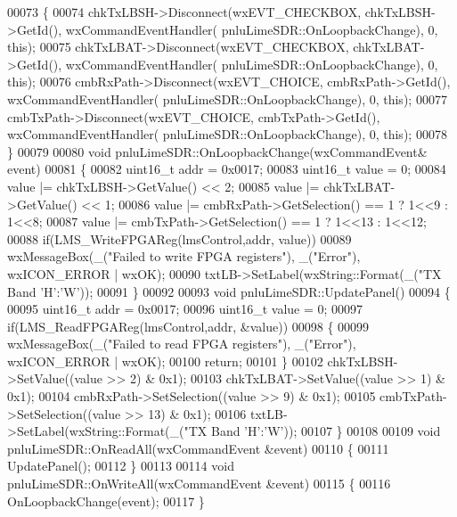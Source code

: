 \begin{DoxyCode}
00073 \{
00074     chkTxLBSH->Disconnect(wxEVT\_CHECKBOX, chkTxLBSH->GetId(), wxCommandEventHandler(
      pnluLimeSDR::OnLoopbackChange), 0, \textcolor{keyword}{this});
00075     chkTxLBAT->Disconnect(wxEVT\_CHECKBOX, chkTxLBAT->GetId(), wxCommandEventHandler(
      pnluLimeSDR::OnLoopbackChange), 0, \textcolor{keyword}{this});
00076     cmbRxPath->Disconnect(wxEVT\_CHOICE, cmbRxPath->GetId(), wxCommandEventHandler(
      pnluLimeSDR::OnLoopbackChange), 0, \textcolor{keyword}{this});
00077     cmbTxPath->Disconnect(wxEVT\_CHOICE, cmbTxPath->GetId(), wxCommandEventHandler(
      pnluLimeSDR::OnLoopbackChange), 0, \textcolor{keyword}{this});
00078 \}
00079 
00080 \textcolor{keywordtype}{void} pnluLimeSDR::OnLoopbackChange(wxCommandEvent& event)
00081 \{
00082     uint16\_t addr = 0x0017;
00083     uint16\_t value = 0;
00084     value |= chkTxLBSH->GetValue() << 2;
00085     value |= chkTxLBAT->GetValue() << 1;
00086     value |= cmbRxPath->GetSelection() == 1 ? 1<<9 : 1<<8;
00087     value |= cmbTxPath->GetSelection() == 1 ? 1<<13 : 1<<12;
00088     \textcolor{keywordflow}{if}(LMS_WriteFPGAReg(lmsControl,addr, value))
00089         wxMessageBox(\_(\textcolor{stringliteral}{"Failed to write FPGA registers"}), \_(\textcolor{stringliteral}{"Error"}), wxICON\_ERROR | wxOK);
00090     txtLB->SetLabel(wxString::Format(\_(\textcolor{stringliteral}{"TX Band %
      'H'}:\textcolor{charliteral}{'W'}));
00091 \}
00092 
00093 \textcolor{keywordtype}{void} pnluLimeSDR::UpdatePanel()
00094 \{
00095     uint16\_t addr = 0x0017;
00096     uint16\_t value = 0;
00097     \textcolor{keywordflow}{if}(LMS_ReadFPGAReg(lmsControl,addr, &value))
00098     \{
00099         wxMessageBox(\_(\textcolor{stringliteral}{"Failed to read FPGA registers"}), \_(\textcolor{stringliteral}{"Error"}), wxICON\_ERROR | wxOK);
00100         \textcolor{keywordflow}{return};
00101     \}
00102     chkTxLBSH->SetValue((value >> 2) & 0x1);
00103     chkTxLBAT->SetValue((value >> 1) & 0x1);
00104     cmbRxPath->SetSelection((value >> 9) & 0x1);
00105     cmbTxPath->SetSelection((value >> 13) & 0x1);
00106     txtLB->SetLabel(wxString::Format(\_(\textcolor{stringliteral}{"TX Band %
      'H'}:\textcolor{charliteral}{'W'}));
00107 \}
00108 
00109 \textcolor{keywordtype}{void} pnluLimeSDR::OnReadAll(wxCommandEvent &event)
00110 \{
00111     UpdatePanel();
00112 \}
00113 
00114 \textcolor{keywordtype}{void} pnluLimeSDR::OnWriteAll(wxCommandEvent &event)
00115 \{
00116     OnLoopbackChange(event);
00117 \}
\end{DoxyCode}
